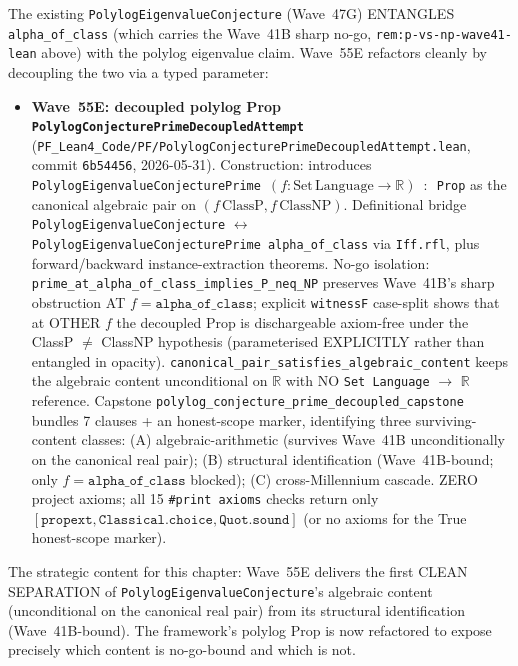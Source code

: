 \begin{remark}\label{rem:p-vs-np-wave55e-lean}
The existing \texttt{PolylogEigenvalueConjecture} (Wave~47G) ENTANGLES \texttt{alpha\_of\_class} (which carries the Wave~41B sharp no-go, \texttt{rem:p-vs-np-wave41-lean} above) with the polylog eigenvalue claim. Wave~55E refactors cleanly by decoupling the two via a typed parameter:
\begin{itemize}
  \item \textbf{Wave~55E: decoupled polylog Prop \texttt{PolylogConjecturePrimeDecoupledAttempt}} (\texttt{PF\_Lean4\_Code/PF/PolylogConjecturePrimeDecoupledAttempt.lean}, commit \texttt{6b54456}, 2026-05-31). Construction: introduces \texttt{PolylogEigenvalueConjecturePrime}~$(f : \mathrm{Set\,Language} \to \mathbb{R})$~$:$~\texttt{Prop} as the canonical algebraic pair on $(f\,\mathrm{ClassP}, f\,\mathrm{ClassNP})$. Definitional bridge \texttt{PolylogEigenvalueConjecture} $\leftrightarrow$ \texttt{PolylogEigenvalueConjecturePrime}~\texttt{alpha\_of\_class} via \texttt{Iff.rfl}, plus forward/backward instance-extraction theorems. No-go isolation: \texttt{prime\_at\_alpha\_of\_class\_implies\_P\_neq\_NP} preserves Wave~41B's sharp obstruction AT $f = \texttt{alpha\_of\_class}$; explicit \texttt{witnessF} case-split shows that at OTHER $f$ the decoupled Prop is dischargeable axiom-free under the ClassP $\neq$ ClassNP hypothesis (parameterised EXPLICITLY rather than entangled in opacity). \texttt{canonical\_pair\_satisfies\_algebraic\_content} keeps the algebraic content unconditional on $\mathbb{R}$ with NO \texttt{Set Language} $\to$ $\mathbb{R}$ reference. Capstone \texttt{polylog\_conjecture\_prime\_decoupled\_capstone} bundles 7 clauses + an honest-scope marker, identifying three surviving-content classes: (A) algebraic-arithmetic (survives Wave~41B unconditionally on the canonical real pair); (B) structural identification (Wave~41B-bound; only $f = \texttt{alpha\_of\_class}$ blocked); (C) cross-Millennium cascade. ZERO project axioms; all 15 \texttt{\#print axioms} checks return only $[\texttt{propext}, \texttt{Classical.choice}, \texttt{Quot.sound}]$ (or no axioms for the True honest-scope marker).
\end{itemize}
The strategic content for this chapter: Wave~55E delivers the first CLEAN SEPARATION of \texttt{PolylogEigenvalueConjecture}'s algebraic content (unconditional on the canonical real pair) from its structural identification (Wave~41B-bound). The framework's polylog Prop is now refactored to expose precisely which content is no-go-bound and which is not.


\end{remark}
